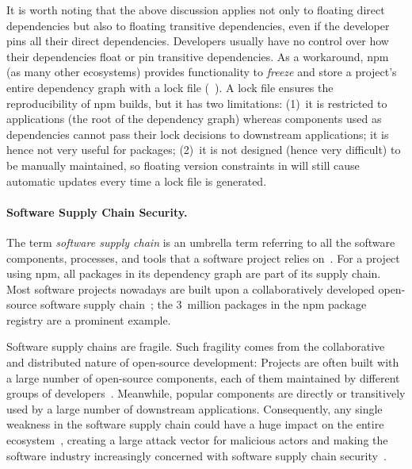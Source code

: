 It is worth noting that the above discussion applies not only to floating direct dependencies but also to floating transitive dependencies, even if the developer pins all their direct dependencies.
Developers usually have no control over how their dependencies float or pin transitive dependencies.
As a workaround, npm (as many other ecosystems) provides functionality to \textit{freeze} and store a project's entire dependency graph with a lock file (~\cite{npmpkglock}). %
A lock file ensures the reproducibility of npm builds, but
it has two limitations: (1)~it is restricted to applications (the root of the dependency graph) whereas components used as dependencies cannot pass their lock decisions to downstream applications; it is hence not very useful for packages; (2)~it is not designed (hence very difficult) to be manually maintained, so floating version constraints in  will still cause automatic updates every time a lock file is generated.

\paragraph{Software Supply Chain Security.}

The term \textit{software supply chain} is an umbrella term referring to all the software components, processes, and tools that a software project relies on~\cite{software-supply-chain-guide}.
For a project using npm, all packages in its dependency graph are part of its supply chain.
Most software projects nowadays are built upon a collaboratively developed open-source software supply chain~\cite{eghbal2016roads}; the 3~million packages in the npm package registry are a prominent example.

Software supply chains are fragile.
Such fragility comes from the collaborative and distributed nature of open-source development: Projects are often built with a large number of open-source components, each of them maintained by different groups of developers~\cite{schueller2024modeling}.
Meanwhile, popular components are directly or transitively used by a large number of downstream applications.
Consequently, any single weakness in the software supply chain could have a huge impact on the entire ecosystem~\cite{DBLP:journals/ese/DecanMG19, DBLP:conf/uss/ZimmermannSTP19}, creating a large attack vector for malicious actors and making the software industry increasingly concerned with software supply chain security~\cite{DBLP:journals/usenix-login/GeerTM20,DBLP:conf/sp/LadisaPMB23}.

